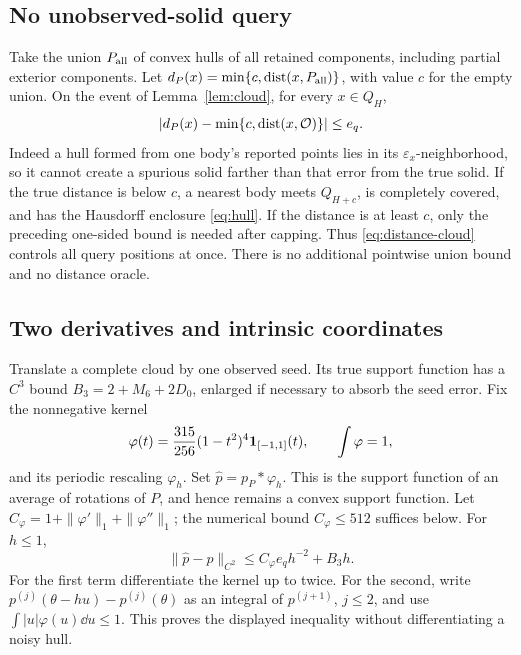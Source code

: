\subsection{No unobserved-solid query}\label{sec:distance}
Take the union $P_{\rm all}$ of convex hulls of all retained components,
including partial exterior components. Let
$d_P(x)=\min\{c,\operatorname{dist}(x,P_{\rm all})\}$, with value $c$ for the empty
union. On the event of Lemma~\ref{lem:cloud}, for every $x\in Q_H$,
\begin{equation}\label{eq:distance-cloud}
 \left|d_P(x)-\min\{c,\operatorname{dist}(x,\mathcal O)\}\right|\le e_q.
\end{equation}
Indeed a hull formed from one body's reported points lies in its
$\varepsilon_x$-neighborhood, so it cannot create a spurious solid farther
than that error from the true solid. If the true distance is below $c$,
a nearest body meets $Q_{H+c}$, is completely covered, and has the
Hausdorff enclosure \eqref{eq:hull}. If the distance is at least $c$,
only the preceding one-sided bound is needed after capping.
Thus \eqref{eq:distance-cloud} controls all query positions at once.
There is no additional pointwise union bound and no distance oracle.

\subsection{Two derivatives and intrinsic coordinates}
Translate a complete cloud by one observed seed. Its true support
function has a $C^3$ bound $B_3=2+M_6+2D_0$, enlarged if necessary to
absorb the seed error. Fix the nonnegative kernel
\[
 \varphi(t)=\frac{315}{256}(1-t^2)^4\mathbf 1_{[-1,1]}(t),\qquad
 \int\varphi=1,
\]
and its periodic rescaling $\varphi_h$. Set
$\widehat p=p_P*\varphi_h$. This is the support function of an average
of rotations of $P$, and hence remains a convex support function. Let
$C_\varphi=1+\|\varphi'\|_1+\|\varphi''\|_1$; the numerical bound
$C_\varphi\le512$ suffices below. For $h\le1$,
\begin{equation}\label{eq:mollify}
 \|\widehat p-p\|_{C^2}
       \le C_\varphi e_qh^{-2}+B_3h.
\end{equation}
For the first term differentiate the kernel up to twice. For the second,
write $p^{(j)}(\theta-hu)-p^{(j)}(\theta)$ as an integral of
$p^{(j+1)}$, $j\le2$, and use $\int|u|\varphi(u)\dd u\le1$.
This proves the displayed inequality without differentiating a noisy hull.

